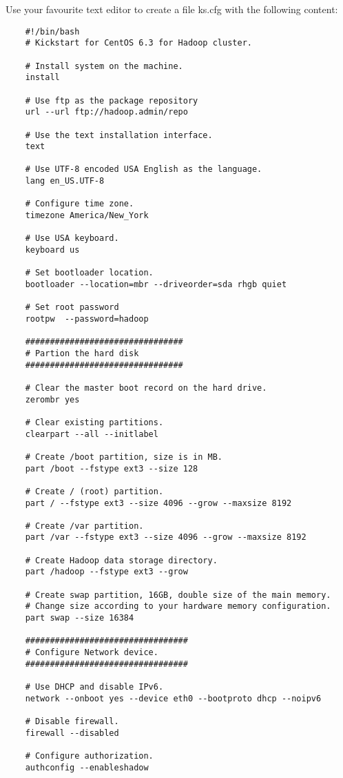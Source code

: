 Use your favourite text editor to create a file ks.cfg with the following content:
\begin{verbatim}
    #!/bin/bash
    # Kickstart for CentOS 6.3 for Hadoop cluster.

    # Install system on the machine.
    install

    # Use ftp as the package repository
    url --url ftp://hadoop.admin/repo

    # Use the text installation interface.
    text

    # Use UTF-8 encoded USA English as the language.
    lang en_US.UTF-8

    # Configure time zone.
    timezone America/New_York

    # Use USA keyboard.
    keyboard us

    # Set bootloader location.
    bootloader --location=mbr --driveorder=sda rhgb quiet

    # Set root password
    rootpw  --password=hadoop

    ################################
    # Partion the hard disk
    ################################

    # Clear the master boot record on the hard drive.
    zerombr yes

    # Clear existing partitions.
    clearpart --all --initlabel

    # Create /boot partition, size is in MB.
    part /boot --fstype ext3 --size 128

    # Create / (root) partition.
    part / --fstype ext3 --size 4096 --grow --maxsize 8192

    # Create /var partition.
    part /var --fstype ext3 --size 4096 --grow --maxsize 8192

    # Create Hadoop data storage directory.
    part /hadoop --fstype ext3 --grow

    # Create swap partition, 16GB, double size of the main memory.
    # Change size according to your hardware memory configuration.
    part swap --size 16384

    #################################
    # Configure Network device.
    #################################

    # Use DHCP and disable IPv6.
    network --onboot yes --device eth0 --bootproto dhcp --noipv6

    # Disable firewall.
    firewall --disabled

    # Configure authorization.
    authconfig --enableshadow


\end{verbatim}
